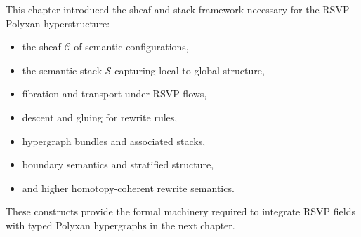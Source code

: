 This chapter introduced the sheaf and stack framework necessary for the
RSVP–Polyxan hyperstructure:
\begin{itemize}
  \item the sheaf $\mathscr{C}$ of semantic configurations,
  \item the semantic stack $\mathcal{S}$ capturing local-to-global structure,
  \item fibration and transport under RSVP flows,
  \item descent and gluing for rewrite rules,
  \item hypergraph bundles and associated stacks,
  \item boundary semantics and stratified structure,
  \item and higher homotopy-coherent rewrite semantics.
\end{itemize}

These constructs provide the formal machinery required to integrate RSVP fields
with typed Polyxan hypergraphs in the next chapter.
